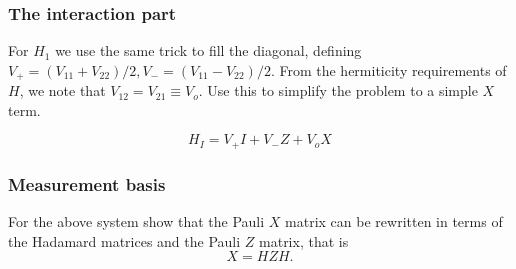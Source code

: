 \documentclass{beamer}
\begin{document}
\begin{frame}
\frametitle{The interaction part}

For $H_1$ we use the same trick to fill the diagonal, defining $V_+ = (V_{11} + V_{22})/2, V_- = (V_{11} - V_{22})/2$. From the hermiticity requirements of $H$, we note that $V_{12} = V_{21} \equiv V_o$. Use this to simplify the problem to a simple $X$ term. 

\[
    H_I = V_+ I + V_- Z + V_o X
\]
\end{frame}

\begin{frame}
\frametitle{Measurement basis}

For the above system show that the Pauli $X$ matrix can be rewritten in terms of the Hadamard matrices and the Pauli $Z$ matrix, that is
\[
X=HZH.
\]
\end{frame}
\end{document}
